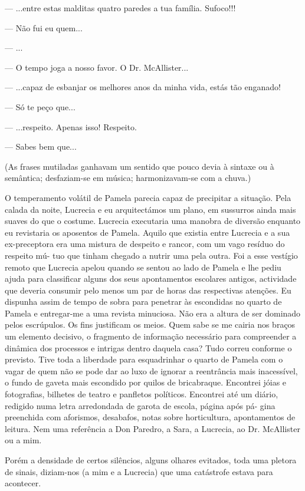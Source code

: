 --- ...entre estas malditas quatro paredes a tua família.
Sufoco!!!

--- Não fui eu quem...

--- ...

--- O tempo joga a nosso favor. O Dr. McAllister...

--- ...capaz de esbanjar os melhores anos da minha vida, estás tão
  enganado!

--- Só te peço que...

--- ...respeito. Apenas isso! Respeito.

--- Sabes bem que...

(As frases mutiladas ganhavam um sentido que pouco devia à sintaxe ou
à semântica; desfaziam-se em música; harmonizavam-se com a chuva.)

O temperamento volátil de Pamela parecia capaz de precipitar a
situação. Pela calada da noite, Lucrecia e eu arquitectámos um plano,
em sussurros ainda mais suaves do que o costume. Lucrecia executaria uma
manobra de diversão enquanto eu revistaria os aposentos de Pamela.
Aquilo que existia entre Lucrecia e a sua ex-preceptora era uma mistura
de despeito e rancor, com um vago resíduo do respeito mú- tuo que tinham
chegado a nutrir uma pela outra. Foi a esse vestígio remoto que Lucrecia
apelou quando se sentou ao lado de Pamela e lhe pediu ajuda para
classificar alguns dos seus apontamentos escolares antigos, actividade
que deveria consumir pelo menos um par de horas das respectivas
atenções. Eu dispunha assim de tempo de sobra para penetrar às escondidas no quarto de Pamela e entregar-me a uma revista minuciosa. Não
era a altura de ser dominado pelos escrúpulos. Os fins justificam os
meios. Quem sabe se me cairia nos braços um elemento decisivo, o
fragmento de informação necessário para compreender a dinâmica dos
processos e intrigas dentro daquela casa? Tudo correu conforme o
previsto. Tive toda a liberdade para esquadrinhar o quarto de Pamela com
o vagar de quem não se pode dar ao luxo de ignorar a reentrância mais
inacessível, o fundo de gaveta mais escondido por quilos de
bricabraque. Encontrei jóias e fotografias, bilhetes de teatro e
panfletos políticos. Encontrei até um diário, redigido numa letra
arredondada de garota de escola, página após pá- gina preenchida com
aforismos, desabafos, notas sobre horticultura, apontamentos de
leitura. Nem uma referência a Don Paredro, a Sara, a Lucrecia, ao Dr.
McAllister ou a mim.

Porém a densidade de certos silêncios, alguns olhares evitados, toda uma pletora de sinais, diziam-nos (a mim e a Lucrecia) que
uma catástrofe estava para acontecer.



